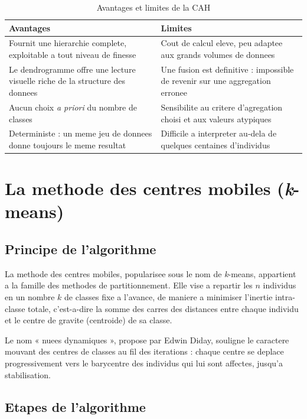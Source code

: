 \documentclass[12pt,a4paper]{book}
\newcommand{\kmeans}{\textit{k}-means}
\begin{document}
	\begin{table}[h]
		\centering
		\caption{Avantages et limites de la CAH}
		\label{tab:cah_avantages}
		\begin{tabular}{p{6cm}p{6cm}}
			\toprule
			\textbf{Avantages} & \textbf{Limites} \\
			\midrule
			Fournit une hierarchie complete, exploitable a tout niveau de finesse & Cout de calcul eleve, peu adaptee aux grands volumes de donnees \\
			Le dendrogramme offre une lecture visuelle riche de la structure des donnees & Une fusion est definitive : impossible de revenir sur une aggregation erronee \\
			Aucun choix \textit{a priori} du nombre de classes & Sensibilite au critere d'agregation choisi et aux valeurs atypiques \\
			Deterministe : un meme jeu de donnees donne toujours le meme resultat & Difficile a interpreter au-dela de quelques centaines d'individus \\
			\bottomrule
		\end{tabular}
	\end{table}
	
	\chapter{La methode des centres mobiles (\kmeans)}
	
	\section{Principe de l'algorithme}
	
	La methode des centres mobiles, popularisee sous le nom de \kmeans, appartient a la famille des methodes de partitionnement. Elle vise a repartir les $n$ individus en un nombre $k$ de classes fixe a l'avance, de maniere a minimiser l'inertie intra-classe totale, c'est-a-dire la somme des carres des distances entre chaque individu et le centre de gravite (centroide) de sa classe.
	
	Le nom « nuees dynamiques », propose par Edwin Diday, souligne le caractere mouvant des centres de classes au fil des iterations : chaque centre se deplace progressivement vers le barycentre des individus qui lui sont affectes, jusqu'a stabilisation.
	
	\section{Etapes de l'algorithme}
	
\end{document}
